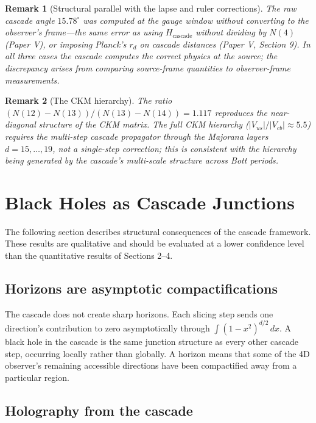 \documentclass[12pt,a4paper]{article}
\newtheorem*{remark}{Remark}
\begin{document}
\begin{remark}[Structural parallel with the lapse and ruler corrections]
The raw cascade angle $15.78^\circ$ was computed at the gauge window without converting to the observer's frame---the same error as using $H_{\text{cascade}}$ without dividing by $N(4)$ (Paper V), or imposing Planck's $r_d$ on cascade distances (Paper V, Section 9). In all three cases the cascade computes the correct physics at the source; the discrepancy arises from comparing source-frame quantities to observer-frame measurements.
\end{remark}

\begin{remark}[The CKM hierarchy]
The ratio $(N(12) - N(13))/(N(13) - N(14)) = 1.117$ reproduces the near-diagonal structure of the CKM matrix. The full CKM hierarchy ($|V_{us}|/|V_{cb}| \approx 5.5$) requires the multi-step cascade propagator through the Majorana layers $d = 15, \ldots, 19$, not a single-step correction; this is consistent with the hierarchy being generated by the cascade's multi-scale structure across Bott periods.
\end{remark}

\section{Black Holes as Cascade Junctions}

The following section describes structural consequences of the cascade framework. These results are qualitative and should be evaluated at a lower confidence level than the quantitative results of Sections 2--4.

\subsection{Horizons are asymptotic compactifications}

The cascade does not create sharp horizons. Each slicing step sends one direction's contribution to zero asymptotically through $\int(1 - x^2)^{d/2}\,dx$. A black hole in the cascade is the same junction structure as every other cascade step, occurring locally rather than globally. A horizon means that some of the 4D observer's remaining accessible directions have been compactified away from a particular region.

\subsection{Holography from the cascade}
\end{document}
